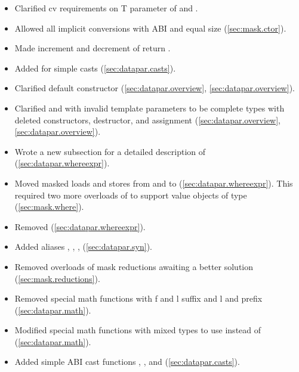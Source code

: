 \begin{itemize}
    \item Clarified cv requirements on \type T parameter of \datapar and \mask.
    \item Allowed all implicit \mask conversions with \fixedsize ABI and equal size (\ref{sec:mask.ctor}).
    \item Made increment and decrement of  return .
    \item Added  for simple casts (\ref{sec:datapar.casts}).
    \item Clarified default constructor (\ref{sec:datapar.overview}, \ref{sec:datapar.overview}).
    \item Clarified \datapar and \mask with invalid template parameters to be complete types with deleted constructors, destructor, and assignment (\ref{sec:datapar.overview}, \ref{sec:datapar.overview}).
    \item Wrote a new subsection for a detailed description of  (\ref{sec:datapar.whereexpr}).
    \item Moved masked loads and stores from \datapar and \mask to  (\ref{sec:datapar.whereexpr}).
          This required two more overloads of  to support value objects of type \mask (\ref{sec:mask.where}).
    \item Removed  (\ref{sec:datapar.whereexpr}).
    \item Added aliases , , ,  (\ref{sec:datapar.syn}).
    \item Removed \bool overloads of mask reductions awaiting a better solution (\ref{sec:mask.reductions}).
    \item Removed special math functions with \code f and \code l suffix and \code l and  prefix (\ref{sec:datapar.math}).
    \item Modified special math functions with mixed types to use  instead of  (\ref{sec:datapar.math}).
    \item Added simple ABI cast functions , , and  (\ref{sec:datapar.casts}).
\end{itemize}

